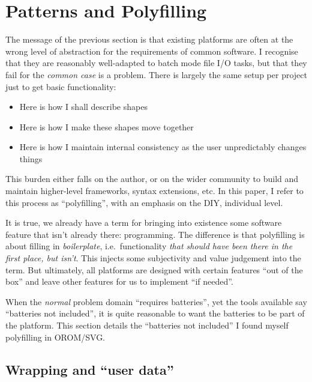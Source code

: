 \hypertarget{patterns-and-polyfilling}{%
\section{Patterns and Polyfilling}\label{patterns-and-polyfilling}}

The message of the previous section is that existing platforms are often
at the wrong level of abstraction for the requirements of common
software. I recognise that they are reasonably well-adapted to batch
mode file I/O tasks, but that they fail for the \emph{common case} is a
problem. There is largely the same setup per project just to get basic
functionality:

\begin{itemize}
\tightlist
\item
  Here is how I shall describe shapes
\item
  Here is how I make these shapes move together
\item
  Here is how I maintain internal consistency as the user unpredictably
  changes things
\end{itemize}

This burden either falls on the author, or on the wider community to
build and maintain higher-level frameworks, syntax extensions, etc. In
this paper, I refer to this process as ``polyfilling'', with an emphasis
on the DIY, individual level.

It is true, we already have a term for bringing into existence some
software feature that isn't already there: programming. The difference
is that polyfilling is about filling in \emph{boilerplate},
i.e.~functionality \emph{that should have been there in the first place,
but isn't}. This injects some subjectivity and value judgement into the
term. But ultimately, all platforms are designed with certain features
``out of the box'' and leave other features for us to implement ``if
needed''.

When the \emph{normal} problem domain ``requires batteries'', yet the
tools available say ``batteries not included'', it is quite reasonable
to want the batteries to be part of the platform. This section details
the ``batteries not included'' I found myself polyfilling in OROM/SVG.

\hypertarget{wrapping-and-user-data}{%
\subsection{Wrapping and ``user data''}\label{wrapping-and-user-data}}

